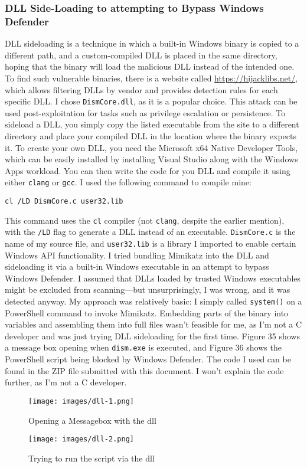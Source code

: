 \documentclass[a4paper]{article}
\newcommand{\abc}{\hfill \break}
\begin{document}
\subsubsection{DLL Side-Loading to attempting to Bypass Windows Defender}
DLL sideloading is a technique in which a built-in Windows binary is copied to a different path, and a custom-compiled DLL is placed in the same directory, hoping that the binary will load the malicious DLL instead of the intended one. To find such vulnerable binaries, there is a website called \url{https://hijacklibs.net/}, which allows filtering DLLs by vendor and provides detection rules for each specific DLL. I chose \texttt{DismCore.dll}, as it is a popular choice. This attack can be used post-exploitation for tasks such as privilege escalation or persistence. \cite{dll-sideloading, beukema_dismcoredll_2023, john_hammond_are_2025}\abc
To sideload a DLL, you simply copy the listed executable from the site to a different directory and place your compiled DLL in the location where the binary expects it.\abc
To create your own DLL, you need the Microsoft x64 Native Developer Tools, which can be easily installed by installing Visual Studio along with the Windows Apps workload. You can then write the code for you DLL and compile it using either \texttt{clang} or \texttt{gcc}. I used the following command to compile mine:
\begin{lstlisting}
cl /LD DismCore.c user32.lib 
\end{lstlisting}
This command uses the \texttt{cl} compiler (not \texttt{clang}, despite the earlier mention), with the \texttt{/LD} flag to generate a DLL instead of an executable. \texttt{DismCore.c} is the name of my source file, and \texttt{user32.lib} is a library I imported to enable certain Windows API functionality. \cite{john_hammond_are_2025}\abc
I tried bundling Mimikatz into the DLL and sideloading it via a built-in Windows executable in an attempt to bypass Windows Defender. I assumed that DLLs loaded by trusted Windows executables might be excluded from scanning—but unsurprisingly, I was wrong, and it was detected anyway. My approach was relatively basic: I simply called \texttt{system()} on a PowerShell command to invoke Mimikatz. Embedding parts of the binary into variables and assembling them into full files wasn’t feasible for me, as I’m not a C developer and was just trying DLL sideloading for the first time.\abc
Figure 35 shows a message box opening when \texttt{dism.exe} is executed, and Figure 36 shows the PowerShell script being blocked by Windows Defender. The code I used can be found in the ZIP file submitted with this document. I won’t explain the code further, as I’m not a C developer.
\begin{figure}[h]
	\texttt{[image: images/dll-1.png]}
	\centering
	\caption{Opening a Messagebox with the dll}
\end{figure}
\begin{figure}[h]
	\texttt{[image: images/dll-2.png]}
	\centering
	\caption{Trying to run the script via the dll}
\end{figure}
\end{document}

